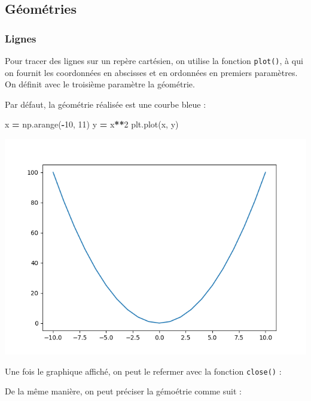 \documentclass[
  12pt,
]{book}
\newenvironment{Shaded}{\begin{snugshade}}{\end{snugshade}}
\newcommand{\DecValTok}[1]{\textcolor[rgb]{0.00,0.00,0.81}{#1}}
\newcommand{\NormalTok}[1]{#1}
\newcommand{\OperatorTok}[1]{\textcolor[rgb]{0.81,0.36,0.00}{\textbf{#1}}}
\numberwithin{equation}{section}
\numberwithin{countremarque}{section}
\begin{document}
\subsection{Géométries}\label{guxe9omuxe9tries}

\subsubsection{Lignes}\label{matplotlib-plot}

Pour tracer des lignes sur un repère cartésien, on utilise la fonction \texttt{plot()}, à qui on fournit les coordonnées en abscisses et en ordonnées en premiers paramètres. On définit avec le troisième paramètre la géométrie.

Par défaut, la géométrie réalisée est une courbe bleue :

\begin{Shaded}
\begin{Highlighting}[]
\NormalTok{x }\OperatorTok{=}\NormalTok{ np.arange(}\OperatorTok{{-}}\DecValTok{10}\NormalTok{, }\DecValTok{11}\NormalTok{)}
\NormalTok{y }\OperatorTok{=}\NormalTok{ x}\OperatorTok{**}\DecValTok{2}
\NormalTok{plt.plot(x, y)}
\end{Highlighting}
\end{Shaded}

\begin{center}\includegraphics[width=9.03in]{figs/pyplot/lignes_1} \end{center}

Une fois le graphique affiché, on peut le refermer avec la fonction \texttt{close()} :

De la même manière, on peut préciser la gémoétrie comme suit :
\end{document}
